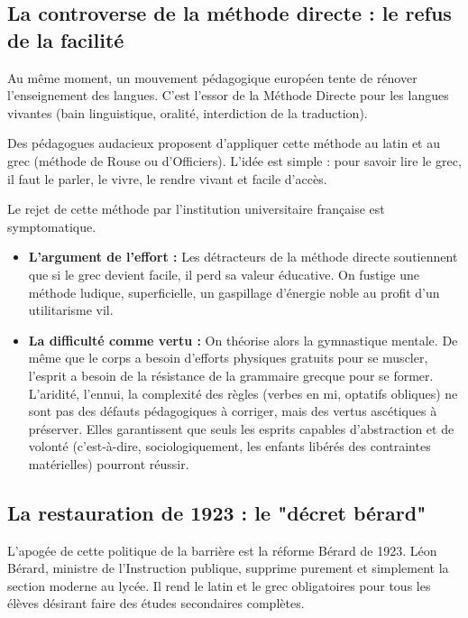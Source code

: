 \subsection{La controverse de la méthode directe : le refus de la facilité}

Au même moment, un mouvement pédagogique européen tente de rénover l'enseignement des langues. C'est
l'essor de la \og Méthode Directe\fg{} pour les langues vivantes (bain linguistique, oralité,
interdiction de la traduction).\cite{I-2-3-ref19}

Des pédagogues audacieux proposent d'appliquer cette méthode au latin et au grec (méthode de Rouse
ou d'Officiers). L'idée est simple : pour savoir lire le grec, il faut le parler, le vivre, le
rendre vivant et facile d'accès.

Le rejet de cette méthode par l'institution universitaire française est symptomatique.

\begin{itemize}\item \textbf{L'argument de l'effort :} Les détracteurs de la méthode directe soutiennent que si le grec devient facile, il perd sa valeur éducative. On fustige une méthode \og ludique\fg{}, \og superficielle\fg{}, un \og gaspillage d'énergie\fg{} noble au profit d'un utilitarisme vil.\cite{I-2-3-ref21}\item \textbf{La difficulté comme vertu :} On théorise alors la \og gymnastique mentale\fg{}.\cite{I-2-3-ref22} De même que le corps a besoin d'efforts physiques gratuits pour se muscler, l'esprit a besoin de la résistance de la grammaire grecque pour se former. L'aridité, l'ennui, la complexité des règles (verbes en \-mi, optatifs obliques) ne sont pas des défauts pédagogiques à corriger, mais des vertus ascétiques à préserver. Elles garantissent que seuls les esprits capables d'abstraction et de volonté (c'est-à-dire, sociologiquement, les enfants libérés des contraintes matérielles) pourront réussir.\end{itemize}

\subsection{La restauration de 1923 : le "décret bérard"}

L'apogée de cette politique de la barrière est la réforme Bérard de 1923. Léon Bérard, ministre de
l'Instruction publique, supprime purement et simplement la section moderne au lycée. Il rend le
latin et le grec obligatoires pour tous les élèves désirant faire des études secondaires
complètes.\cite{I-2-3-ref17}

